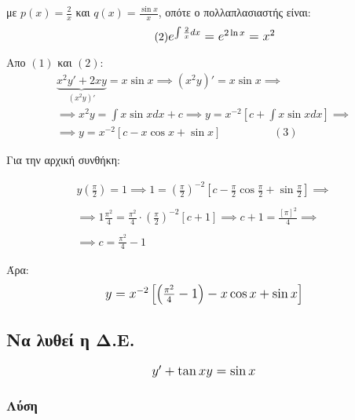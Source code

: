 \documentclass[12pt,a4paper]{article}
\begin{document}
με $\displaystyle p(x)=\frac{2}{x}$ και $\displaystyle q(x)=\frac{\sin x}{x}$, οπότε ο πολλαπλασιαστής είναι: \\

\begin{equation} \tag{2}
\mbox{\large\(
e^{\int\frac{2}{x}dx}=e^{2\ln x}=x^2
\)}
\end{equation}

Απο $(1)$ και $(2)$: \\

\begin{gather*}
\underbrace{x^2y'+2xy}_{\left(x^2y\right)'}=x\sin x \implies \left(x^2y\right)'=x\sin x \implies \\ \implies x^2y=\int x\sin x dx +c \implies y=x^{-2}\left[c+\int x\sin x dx\right] \implies \\ \implies y=x^{-2}\left[c-x\cos x + \sin x\right] \hspace{2cm}  (3)
\end{gather*}

Για την αρχική συνθήκη:

\begin{gather*}
y\left(\frac{\pi}{2}\right)=1 \implies 1=\left(\frac{\pi}{2}\right)^{-2}\left[c-\frac{\pi}{2}\cos \frac{\pi}{2}+\sin \frac{\pi}{2}\right] \implies \\ \\ \implies 1\frac{{\pi}^2}{4}=\frac{{\pi}^2}{4}\cdot \left(\frac{\pi}{2}\right)^{-2}[c+1] \implies c+1 =\frac{
[\pi]^2}{4} \implies \\ \\ \implies \boxed{c=\frac{{\pi}^2}{4}-1}
\end{gather*}

Άρα:
\begin{equation*}
\mbox{\large\(
y=x^{-2}\left[ \left(\frac{\pi ^2}{4} -1\right) -x\cos x + \sin x \right]
\)}
\end{equation*}

\newpage

\subsection{Να λυθεί η Δ.Ε.}

\begin{equation*}
\mbox{\large\(
y' + \tan x y =\sin x
\)}
\end{equation*}

\subsubsection*{Λύση}
\end{document}

